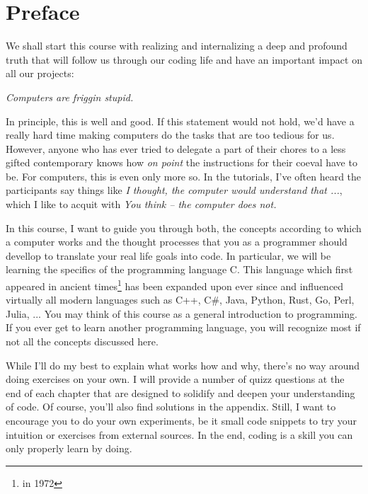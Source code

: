 \chapter*{Preface}
We shall start this course with realizing and internalizing a deep and profound truth that will follow us through our coding life and have an important impact on all our projects:

\begin{defbox}
\begin{center}
\begin{Huge}
	\emph{Computers are friggin stupid.}
\end{Huge}
\end{center}
\end{defbox}

In principle, this is well and good. If this statement would not hold, we'd have a really hard time making computers do the tasks that are too tedious for us. However, anyone who has ever tried to delegate a part of their chores to a less gifted contemporary knows how \emph{on point} the instructions for their coeval have to be. For computers, this is even only more so. In the tutorials, I've often heard the participants say things like \emph{I thought, the computer would understand that ...}, which I like to acquit with \emph{You think -- the computer does not.}

In this course, I want to guide you through both, the concepts according to which a computer works and the thought processes that you as a programmer should devellop to translate your real life goals into code. In particular, we will be learning the specifics of the programming language C. This language which first appeared in ancient times\footnote{\ie in 1972} has been expanded upon ever since and influenced virtually all modern languages such as C++, C\#, Java, Python, Rust, Go, Perl, Julia, ... You may think of this course as a general introduction to programming. If you ever get to learn another programming language, you will recognize most if not all the concepts discussed here.

While I'll do my best to explain what works how and why, there's no way around doing exercises on your own. I will provide a number of quizz questions at the end of each chapter that are designed to solidify and deepen your understanding of code. Of course, you'll also find solutions in the appendix. Still, I want to encourage you to do your own experiments, be it small code snippets to try your intuition or exercises from external sources. In the end, coding is a skill you can only properly learn by doing.

